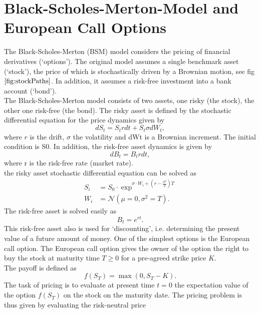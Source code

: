 \section{Black-Scholes-Merton-Model and European Call Options}

The Black-Scholes-Merton (BSM) model considers the pricing of financial derivatives (‘options’). The original model assumes a single benchmark asset (‘stock’), the price of which is stochastically driven by a Brownian motion, see fig $\ref{fig:stockPaths}$. In addition, it assumes a risk-free investment into a bank account (‘bond’).\\
The Black-Scholes-Merton model consists of two assets, one risky (the stock), the other one risk-free (the bond). The risky asset is defined by the stochastic differential equation for the price dynamics given by
\begin{equation}
    dS_t = S_t r dt + S_t \sigma dW_t,
\end{equation}
where $r$ is the drift, $\sigma$ the volatility and dWt is a Brownian increment. The initial condition is S0. In addition, the risk-free asset dynamics is given by
\begin{equation}
   dB_t = B_t r dt, 
\end{equation}
where r is the risk-free rate (market rate).\\
the risky asset stochastic differential equation can be solved as
\begin{align}
	   S_i &=S_{0}\cdot\exp^{\sigma \cdot W_i+(r-\frac{\sigma^2}{2})T} \label{eq:S_T} \\
	   W_i &= \mathcal{N}(\mu=0,\sigma^2=T) \label{eq:W_T}.
\end{align}
The risk-free asset is solved easily as
\begin{equation}
    B_t = e^{rt}.
\end{equation}
This risk-free asset also is used for ‘discounting’, i.e. determining the present value of a future amount of money.
One of the simplest options is the European call option. The European call option gives the owner of the option the right to buy the stock at maturity time $T \geq 0$ for a pre-agreed strike price $K$.\\
The payoff is defined as
\begin{equation}
    f(S_T) = \max(0, S_T - K ).
\end{equation}
The task of pricing is to evaluate at present time $t = 0$ the expectation value of the option $f(S_T)$ on the stock on the maturity date.
The pricing problem is thus given by evaluating the risk-neutral price
